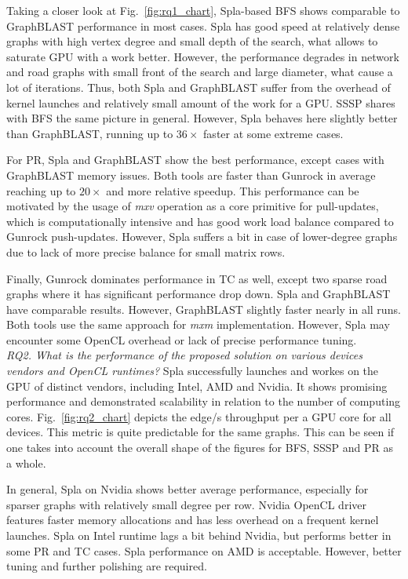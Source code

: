 Taking a closer look at Fig.~\ref{fig:rq1_chart}, Spla-based BFS shows comparable to GraphBLAST performance in most cases. Spla has good speed at relatively dense graphs with high vertex degree and small depth of the search, what allows to saturate GPU with a work better. However, the performance degrades in network and road graphs with small front of the search and large diameter, what cause a lot of iterations. Thus, both Spla and GraphBLAST suffer from the overhead of kernel launches and relatively small amount of the work for a GPU. SSSP shares with BFS the same picture in general. However, Spla behaves here slightly better than GraphBLAST, running up to $36\times$ faster at some extreme cases.

For PR, Spla and GraphBLAST show the best performance, except cases with GraphBLAST memory issues. Both tools are faster than Gunrock in average reaching up to $20\times$ and more relative speedup. This performance can be motivated by the usage of \textit{mxv} operation as a core primitive for pull-updates, which is computationally intensive and has good work load balance compared to Gunrock push-updates. However, Spla suffers a bit in case of lower-degree graphs due to lack of more precise balance for small matrix rows.

Finally, Gunrock dominates performance in TC as well, except two sparse road graphs where it has significant performance drop down. Spla and GraphBLAST have comparable results. However, GraphBLAST slightly faster nearly in all runs. Both tools use the same approach for \textit{mxm} implementation. However, Spla may encounter some OpenCL overhead or lack of precise performance tuning.\\

\textit{RQ2. What is the performance of the proposed solution on various devices vendors and OpenCL runtimes?} Spla successfully launches and workes on the GPU of distinct vendors, including Intel, AMD and Nvidia. It shows promising performance and demonstrated scalability in relation to the number of computing cores. Fig.~\ref{fig:rq2_chart} depicts the edge/s throughput per a GPU core for all devices. This metric is quite predictable for the same graphs. This can be seen if one takes into account the overall shape of the figures for BFS, SSSP and PR as a whole.

In general, Spla on Nvidia shows better average performance, especially for sparser graphs with relatively small degree per row. Nvidia OpenCL driver features faster memory allocations and has less overhead on a frequent kernel launches. Spla on Intel runtime lags a bit behind Nvidia, but performs better in some PR and TC cases. Spla performance on AMD is acceptable. However, better tuning and further polishing are required.\\

